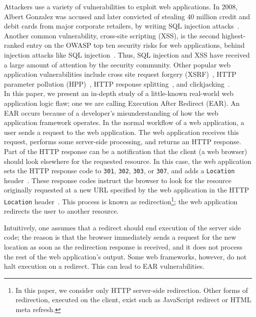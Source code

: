 Attackers use a variety of vulnerabilities to exploit web applications. In
2008, Albert Gonzalez was accused and later convicted of stealing 40
million credit and debit cards from major corporate retailers, by writing
SQL injection attacks~\cite{gonzalez08:indictment,ortiz10:outcome}. Another
common vulnerability, cross-site scripting (XSS), is the second
highest-ranked entry on the OWASP top ten security risks for web
applications, behind injection attacks like SQL
injection~\cite{owasptopten}. Thus, SQL injection and XSS have received a
large amount of attention by the security community. Other popular web
application vulnerabilities include cross site request forgery
(XSRF)~\cite{barth08:csrf}, HTTP parameter pollution
(HPP)~\cite{carettoni09:hpp,balduzzi11:hpp}, HTTP response
splitting~\cite{klein04:http-response-splitting}, and
clickjacking~\cite{hansen08:clickjacking,balduzzi10:clickjacking}. 
\\

\noindent{}In this paper, we present an in-depth study of a little-known
real-world web application logic flaw; one we are calling Execution
After Redirect (EAR). An EAR occurs because of a developer's
misunderstanding of how the web application framework operates. In the
normal workflow of a web application, a user sends a request to the web
application. The web application receives this request, performs some
server-side processing, and returns an HTTP response. Part of the HTTP
response can be a notification that the client (a web browser) should look
elsewhere for the requested resource. In this case, the web application
sets the HTTP response code to \texttt{301}, \texttt{302},
\texttt{303}, or \texttt{307}, and adds a \texttt{Location}
header~\cite{fielding99:http11statuscode}. These response codes instruct
the browser to look for the resource originally requested at a new URL
specified by the web application in the HTTP \texttt{Location}
header~\cite{fielding99:http11location}. This process is known as
redirection\footnote{In this paper, we consider only HTTP server-side
  redirection. Other forms of redirection, executed on the client, exist
  such as JavaScript redirect or HTML meta refresh.}; the web application
redirects the user to another resource.

Intuitively, one assumes that a redirect should end execution of the
server side code; the reason is that the browser immediately sends a
request for the new location as soon as the redirection response is
received, and it does not process the rest of the web application's output. Some
web frameworks, however, do not halt execution on a redirect. This can
lead to EAR vulnerabilities.
 
